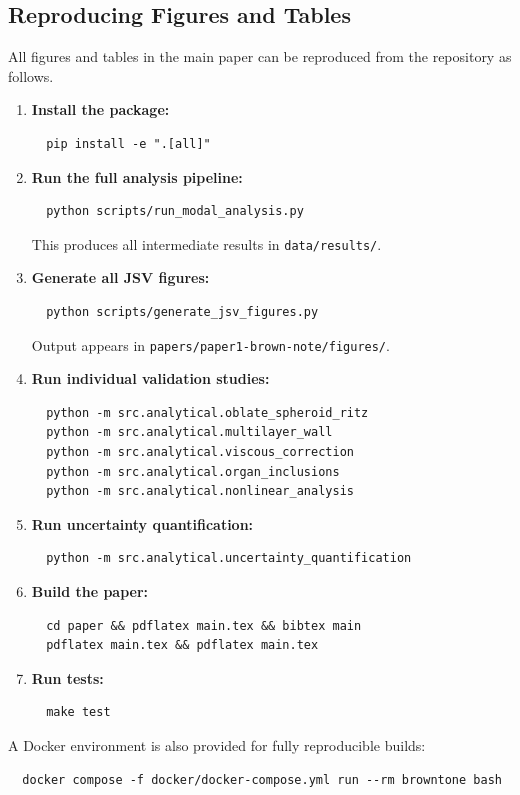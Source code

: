 \documentclass[12pt]{article}
\begin{document}
\subsection{Reproducing Figures and Tables}
\label{sec:reproduce}

All figures and tables in the main paper can be reproduced from the repository
as follows.

\begin{enumerate}[nosep]
  \item \textbf{Install the package:}
\begin{verbatim}
  pip install -e ".[all]"
\end{verbatim}

  \item \textbf{Run the full analysis pipeline:}
\begin{verbatim}
  python scripts/run_modal_analysis.py
\end{verbatim}
    This produces all intermediate results in \texttt{data/results/}.

  \item \textbf{Generate all JSV figures:}
\begin{verbatim}
  python scripts/generate_jsv_figures.py
\end{verbatim}
    Output appears in \texttt{papers/paper1-brown-note/figures/}.

  \item \textbf{Run individual validation studies:}
\begin{verbatim}
  python -m src.analytical.oblate_spheroid_ritz
  python -m src.analytical.multilayer_wall
  python -m src.analytical.viscous_correction
  python -m src.analytical.organ_inclusions
  python -m src.analytical.nonlinear_analysis
\end{verbatim}

  \item \textbf{Run uncertainty quantification:}
\begin{verbatim}
  python -m src.analytical.uncertainty_quantification
\end{verbatim}

  \item \textbf{Build the paper:}
\begin{verbatim}
  cd paper && pdflatex main.tex && bibtex main
  pdflatex main.tex && pdflatex main.tex
\end{verbatim}

  \item \textbf{Run tests:}
\begin{verbatim}
  make test
\end{verbatim}
\end{enumerate}

\noindent
A Docker environment is also provided for fully reproducible builds:
\begin{verbatim}
  docker compose -f docker/docker-compose.yml run --rm browntone bash
\end{verbatim}
\end{document}
